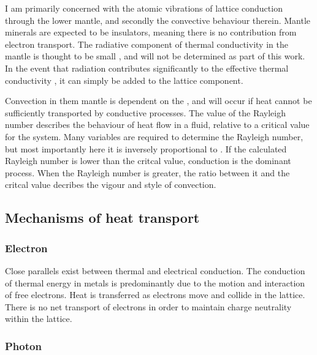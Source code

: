 I am primarily concerned with the atomic vibrations of lattice conduction through the lower mantle, and secondly the convective behaviour therein. Mantle minerals are expected to be insulators, meaning there is no contribution from electron transport. The radiative component of thermal conductivity in the mantle is thought to be small \citep{Goncharov2008}, and will not be determined as part of this work. In the event that radiation contributes significantly to the effective thermal conductivity \citep{Keppler2008}, it can simply be added to the lattice component.

Convection in them mantle is dependent on the \tc, and will occur if heat cannot be sufficiently transported by conductive processes. The value of the Rayleigh number describes the behaviour of heat flow in a fluid, relative to a critical value for the system. Many variables are required to determine the Rayleigh number, but most importantly here it is inversely proportional to \tc. If the calculated Rayleigh number is lower than the critcal value, conduction is the dominant process. When the Rayleigh number is greater, the ratio between it and the critcal value decribes the vigour and style of convection.

\subsection{Mechanisms of heat transport}

\subsubsection{Electron}

Close parallels exist between thermal and electrical conduction. The conduction of thermal energy in metals is predominantly due to the motion and interaction of free electrons. Heat is transferred as electrons move and collide in the lattice. There is no net transport of electrons in order to maintain charge neutrality within the lattice.

\subsubsection{Photon}

